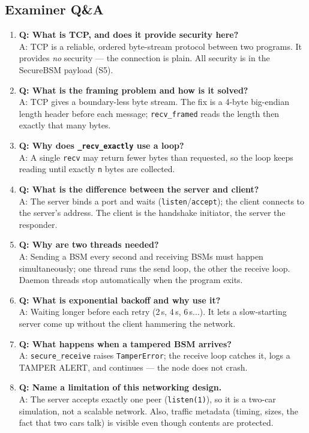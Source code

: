 \documentclass[11pt,a4paper]{article}
\begin{document}
\subsection{Examiner Q\&A}
\begin{enumerate}
  \item \textbf{Q: What is TCP, and does it provide security here?}\\
        A: TCP is a reliable, ordered byte-stream protocol between two programs.
        It provides \emph{no} security --- the connection is plain. All security
        is in the SecureBSM payload (S5).
  \item \textbf{Q: What is the framing problem and how is it solved?}\\
        A: TCP gives a boundary-less byte stream. The fix is a 4-byte big-endian
        length header before each message; \texttt{recv\_framed} reads the length
        then exactly that many bytes.
  \item \textbf{Q: Why does \texttt{\_recv\_exactly} use a loop?}\\
        A: A single \texttt{recv} may return fewer bytes than requested, so the
        loop keeps reading until exactly \texttt{n} bytes are collected.
  \item \textbf{Q: What is the difference between the server and client?}\\
        A: The server binds a port and waits (\texttt{listen}/\texttt{accept});
        the client connects to the server's address. The client is the handshake
        initiator, the server the responder.
  \item \textbf{Q: Why are two threads needed?}\\
        A: Sending a BSM every second and receiving BSMs must happen
        simultaneously; one thread runs the send loop, the other the receive
        loop. Daemon threads stop automatically when the program exits.
  \item \textbf{Q: What is exponential backoff and why use it?}\\
        A: Waiting longer before each retry (2\,s, 4\,s, 6\,s...). It lets a
        slow-starting server come up without the client hammering the network.
  \item \textbf{Q: What happens when a tampered BSM arrives?}\\
        A: \texttt{secure\_receive} raises \texttt{TamperError}; the receive loop
        catches it, logs a TAMPER ALERT, and continues --- the node does not crash.
  \item \textbf{Q: Name a limitation of this networking design.}\\
        A: The server accepts exactly one peer (\texttt{listen(1)}), so it is a
        two-car simulation, not a scalable network. Also, traffic metadata
        (timing, sizes, the fact that two cars talk) is visible even though
        contents are protected.
\end{enumerate}
\end{document}
